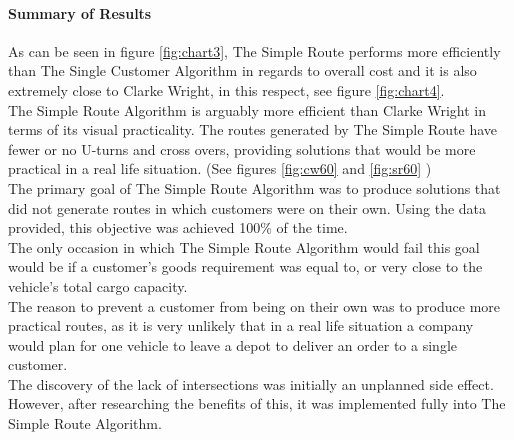 \documentclass[conference]{acmsiggraph}
\begin{document}
		\paragraph{Summary of Results}
		As can be seen in figure \ref{fig:chart3}, The Simple Route performs more efficiently than The Single Customer Algorithm in regards to overall cost and it is also extremely close to Clarke Wright, in this respect, see figure \ref{fig:chart4}.\\
		The Simple Route Algorithm is arguably more efficient than Clarke Wright in terms of its visual practicality. The routes generated by The Simple Route have fewer or no  U-turns and cross overs, providing solutions that would be more practical in a real life situation. (See figures \ref{fig:cw60} and  \ref{fig:sr60} )\\
		The primary goal of The Simple Route Algorithm was to produce solutions that did not generate routes in which customers were on their own. Using the data provided, this objective was achieved 100\% of the time.\\ 
		The only occasion in which The Simple Route Algorithm would fail this goal would be if a customer's goods requirement was equal to, or very close to the vehicle's total cargo capacity.\\
		The reason to prevent a customer from being on their own was to produce more practical routes, as it is very unlikely that in a real life situation a company would plan for one vehicle to leave a depot to deliver an order to a single customer.\\
		The discovery of the lack of intersections was initially an unplanned side effect. However, after researching the benefits of this, it was implemented fully into The Simple Route Algorithm.
		
\end{document}
